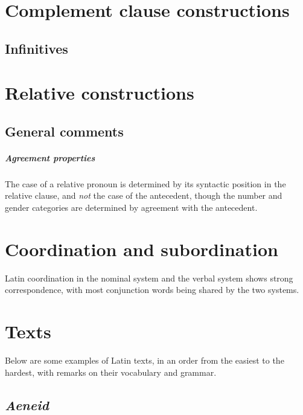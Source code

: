 \documentclass[a4paper, oneside, 12pt]{report}
\newcommand{\literature}[1]{\textit{#1}}
\begin{document}
\chapter{Complement clause constructions}\label{chap:complement-clause}


\section{Infinitives}



\chapter{Relative constructions}\label{chap:relative-clause}

\section{General comments}

\paragraph*{Agreement properties}\label{sec:relative-clause.overview.agreement}

The case of a relative pronoun is determined 
by its syntactic position in the relative clause, 
and \emph{not} the case of the antecedent,
though the number and gender categories 
are determined by agreement with the antecedent.

\chapter{Coordination and subordination}

Latin coordination in the nominal system and the verbal system 
shows strong correspondence,
with most conjunction words being shared
by the two systems.



\chapter{Texts}

Below are some examples of Latin texts, 
in an order from the easiest to the hardest,
with remarks on their vocabulary and grammar. 

\section{\literature{Aeneid}}
\end{document}

